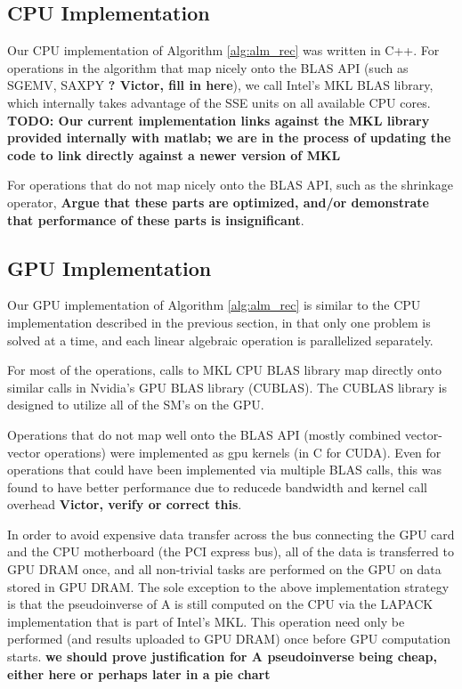 \documentclass[10pt,twocolumn,letterpaper]{article}
\begin{document}
\subsection{CPU Implementation} Our CPU implementation of Algorithm
\ref{alg:alm_rec} was written in C++.  For operations in the algorithm that map
nicely onto the BLAS API (such as SGEMV, SAXPY {\bf? Victor, fill in here}), we
call Intel's MKL BLAS library, which internally takes advantage of the SSE
units on all available CPU cores. 
{\bf TODO: Our current implementation links against the MKL
library provided internally with matlab; we are in the process of updating the code to link directly against a newer version
of MKL}  

For operations that do not map nicely onto the BLAS API, such as the shrinkage
operator, {\bf Argue that these parts are optimized, and/or demonstrate that
performance of these parts is insignificant}.

\subsection{GPU Implementation} Our GPU implementation of Algorithm
\ref{alg:alm_rec} is similar to the CPU implementation described in the
previous section, in that only one problem is solved at a time, and each linear
algebraic operation is parallelized separately.

For most of the operations, calls to MKL CPU BLAS library map directly onto
similar calls in Nvidia's GPU BLAS library (CUBLAS).  The CUBLAS library is
designed to utilize all of the SM's on the GPU.  

Operations that do not map well onto the BLAS API (mostly combined
vector-vector operations) were implemented as gpu kernels (in C for CUDA).
Even for operations that could have been implemented via multiple BLAS calls,
this was found to have better performance due to reducede bandwidth and kernel
call overhead {\bf Victor, verify or correct this}.

In order to avoid expensive data transfer across the bus connecting the GPU
card and the CPU motherboard (the PCI express bus), all of the data is
transferred to GPU DRAM once, and all non-trivial tasks are performed on the
GPU on data stored in GPU DRAM.  The sole exception to the above implementation
strategy is that the pseudoinverse of A is still computed on the CPU via the
LAPACK implementation that is part of Intel's MKL. This operation need only be
performed (and results uploaded to GPU DRAM) once before GPU computation
starts. {\bf we should prove justification for A pseudoinverse being cheap,
either here or perhaps later in a pie chart}
\end{document}
